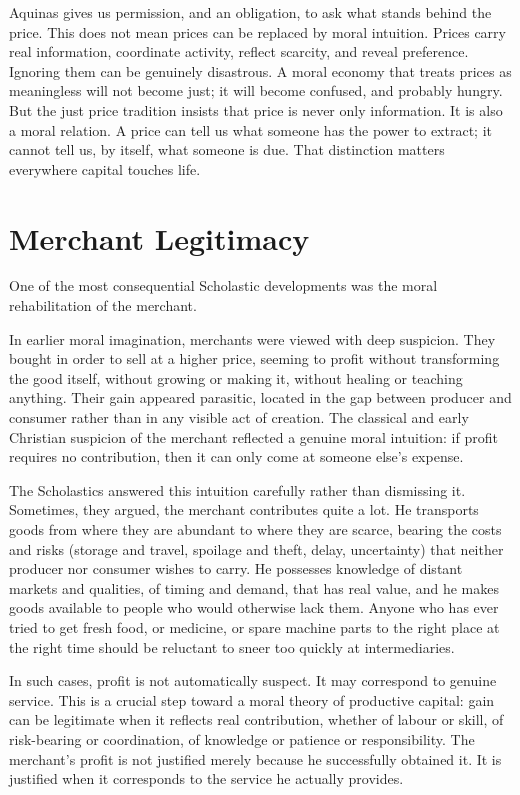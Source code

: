 \documentclass[11pt,a4paper,oneside]{book}
\begin{document}
Aquinas gives us permission, and an obligation, to ask what stands behind the price. This does not mean prices can be replaced by moral intuition. Prices carry real information, coordinate activity, reflect scarcity, and reveal preference. Ignoring them can be genuinely disastrous. A moral economy that treats prices as meaningless will not become just; it will become confused, and probably hungry. But the just price tradition insists that price is never only information. It is also a moral relation. A price can tell us what someone has the power to extract; it cannot tell us, by itself, what someone is due. That distinction matters everywhere capital touches life.

\section*{Merchant Legitimacy}

One of the most consequential Scholastic developments was the moral rehabilitation of the merchant.

In earlier moral imagination, merchants were viewed with deep suspicion. They bought in order to sell at a higher price, seeming to profit without transforming the good itself, without growing or making it, without healing or teaching anything. Their gain appeared parasitic, located in the gap between producer and consumer rather than in any visible act of creation. The classical and early Christian suspicion of the merchant reflected a genuine moral intuition: if profit requires no contribution, then it can only come at someone else's expense.

The Scholastics answered this intuition carefully rather than dismissing it. Sometimes, they argued, the merchant contributes quite a lot. He transports goods from where they are abundant to where they are scarce, bearing the costs and risks (storage and travel, spoilage and theft, delay, uncertainty) that neither producer nor consumer wishes to carry. He possesses knowledge of distant markets and qualities, of timing and demand, that has real value, and he makes goods available to people who would otherwise lack them. Anyone who has ever tried to get fresh food, or medicine, or spare machine parts to the right place at the right time should be reluctant to sneer too quickly at intermediaries.

In such cases, profit is not automatically suspect. It may correspond to genuine service. This is a crucial step toward a moral theory of productive capital: gain can be legitimate when it reflects real contribution, whether of labour or skill, of risk-bearing or coordination, of knowledge or patience or responsibility. The merchant's profit is not justified merely because he successfully obtained it. It is justified when it corresponds to the service he actually provides.
\end{document}

